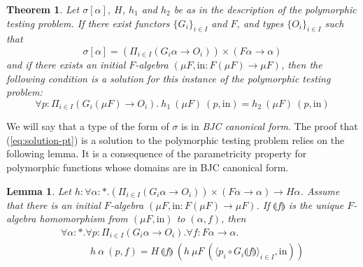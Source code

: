 \documentclass{article}[12 pt]
\newcommand{\fold}[1]{\llparenthesis #1 \rrparenthesis}
\newtheorem{thm}{Theorem}
\newtheorem{lemma}{Lemma}
\theoremstyle{problemstyle}
\begin{document}
\begin{thm}\label{thm:poly-testing}
Let $\sigma[\alpha]$, $H$, $h_1$ and $h_2$ be as in the description of
the polymorphic testing problem. If there exist functors $\{G_i\}_{i
  \in I}$ and $F$, and types $\{O_i\}_{i \in I}$ such that
\begin{displaymath}
  \sigma[\alpha] = \left( \Pi_{i \in I} (G_i \alpha \to O_i)\right) 
  \times  (F \alpha \to \alpha)
\end{displaymath}
and if there exists an initial $F$-algebra $(\mu F, \mathrm{in} : F(\mu
F) \to \mu F)$, then the following condition is a solution for this
instance of the polymorphic testing problem:
\begin{equation}
  \label{eq:solution-pt}
  \forall p : \Pi_{i \in I}(G_i(\mu F) \to O_i).~h_1~(\mu F)~(p,
  \mathrm{in}) = h_2~(\mu F)~(p, \mathrm{in})
\end{equation}
\end{thm}

We will say that a type of the form of $\sigma$ is in {\em BJC
  canonical form}.  The proof that (\ref{eq:solution-pt}) is a
solution to the polymorphic testing problem relies on the following
lemma. It is a consequence of the parametricity property for
polymorphic functions whose domains are in BJC canonical form.
\begin{lemma}\label{lem:initial-algebra-ok}
  Let $h : \forall \alpha : *. \left(\Pi_{i \in I} (G_i \alpha \to
  O_i)\right) \times (F \alpha \to \alpha) \to H\alpha$. Assume that
  there is an initial $F$-algebra $(\mu F, \mathrm{in} : F(\mu F) \to
  \mu F)$. If $\fold{f}$ is the unique $F$-algebra homomorphism from
  $(\mu F, \mathrm{in})$ to $(\alpha, f)$, then
  \begin{displaymath}
    \begin{array}{l}
      \forall \alpha : *. \forall p : \Pi_{i \in I} (G_i \alpha \to
      O_i). \forall f : F\alpha \to \alpha.\\ \quad\quad\quad
      h~\alpha~(p, f) = H~\fold{f}~(h~\mu F~(\langle p_i \circ
      G_i\fold{f} \rangle_{i \in I}, \mathrm{in}))
    \end{array}
  \end{displaymath}
\end{lemma}
\end{document}
